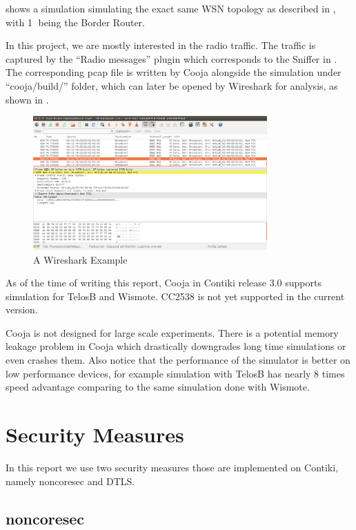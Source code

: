  shows a simulation simulating the exact same WSN topology as described in , with \textcircled{1} being the Border Router. 

In this project, we are mostly interested in the radio traffic. The traffic is captured by the ``Radio messages'' plugin which corresponds to the Sniffer in . The corresponding pcap file is written by Cooja alongside the simulation under ``cooja/build/'' folder, which can later be opened by Wireshark\cite{Wireshark} for analysis, as shown in .

\begin{figure}[h!]
	\center
	\includegraphics[width=0.8\textwidth]{fig/wireshark_example.png}
	\caption{A Wireshark Example}
	\label{Fig: A Wireshark Example}
\end{figure}

As of the time of writing this report, Cooja in Contiki release 3.0 supports simulation for TelosB and Wismote. CC2538 is not yet supported in the current version.

Cooja is not designed for large scale experiments. There is a potential memory leakage problem in Cooja which drastically downgrades long time simulations or even crashes them. Also notice that the performance of the simulator is better on low performance devices, for example simulation with TelosB has nearly 8 times speed advantage comparing to the same simulation done with Wismote.

\section{Security Measures}

In this report we use two security measures those are implemented on Contiki, namely noncoresec and DTLS.

\subsection{noncoresec}

